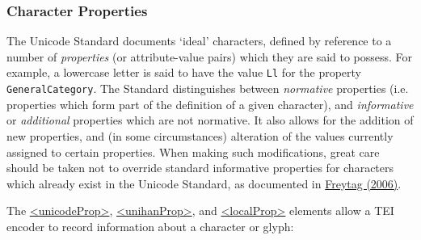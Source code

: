 \subsubsection[{Character Properties}]{Character Properties}\label{ucsprops}\par
The Unicode Standard documents ‘ideal’ characters, defined by reference to a number of \textit{properties} (or attribute-value pairs) which they are said to possess. For example, a lowercase letter is said to have the value \texttt{Ll} for the property \texttt{General\textunderscore Category}. The Standard distinguishes between \textit{normative} properties (i.e. properties which form part of the definition of a given character), and \textit{informative} or \textit{additional} properties which are not normative. It also allows for the addition of new properties, and (in some circumstances) alteration of the values currently assigned to certain properties. When making such modifications, great care should be taken not to override standard informative properties for characters which already exist in the Unicode Standard, as documented in \hyperref[CH-eg-02]{Freytag (2006)}.\par
The \hyperref[TEI.unicodeProp]{<unicodeProp>}, \hyperref[TEI.unihanProp]{<unihanProp>}, and \hyperref[TEI.localProp]{<localProp>} elements allow a TEI encoder to record information about a character or glyph: 
